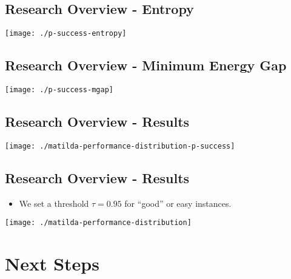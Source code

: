 \documentclass[
]{article}
\providecommand{\tightlist}{%
  \setlength{\itemsep}{0pt}\setlength{\parskip}{0pt}}
\begin{document}
\hypertarget{research-overview---entropy}{%
\subsection{Research Overview -
Entropy}\label{research-overview---entropy}}

\begin{center}\texttt{[image: ./p-success-entropy]} \end{center}

\hypertarget{research-overview---minimum-energy-gap}{%
\subsection{Research Overview - Minimum Energy
Gap}\label{research-overview---minimum-energy-gap}}

\begin{center}\texttt{[image: ./p-success-mgap]} \end{center}

\hypertarget{research-overview---results-3}{%
\subsection{Research Overview -
Results}\label{research-overview---results-3}}

\begin{center}\texttt{[image: ./matilda-performance-distribution-p-success]} \end{center}

\hypertarget{research-overview---results-4}{%
\subsection{Research Overview -
Results}\label{research-overview---results-4}}

\begin{itemize}
\tightlist
\item
  We set a threshold \(\tau=0.95\) for ``good'' or easy instances.
\end{itemize}

\begin{center}\texttt{[image: ./matilda-performance-distribution]} \end{center}

\hypertarget{next-steps}{%
\section{Next Steps}\label{next-steps}}
\end{document}
